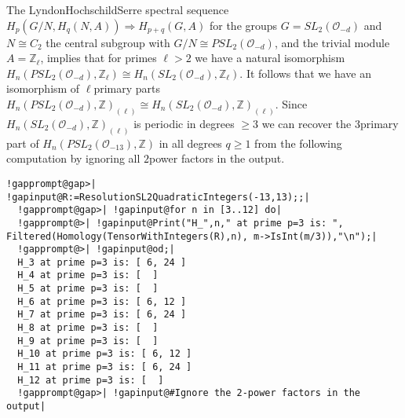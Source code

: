 \documentclass[a4paper,11pt]{report}
\begin{document}
{{\begin{Verbatim}[commandchars=@|A,fontsize=\small,frame=single,label=Example]
\end{Verbatim}
 The Lyndon\texttt{}Hochschild\texttt{}Serre spectral
sequence $H_p(G/N,H_q(N,A)) \Rightarrow H_{p+q}(G,A)$ for the groups $G=SL_2({\mathcal O}_{-d})$ and $N\cong C_2$ the central subgroup with $G/N\cong PSL_2({\mathcal O}_{-d})$, and the trivial module $A = \mathbb Z_{\ell}$, implies that for primes $\ell>2$ we have a natural isomorphism $H_n(PSL_2({\mathcal O}_{-d}),\mathbb Z_{\ell}) \cong H_n(SL_2({\mathcal
O}_{-d}),\mathbb Z_{\ell})$. It follows that we have an isomorphism of $\ell$\texttt{}primary parts $H_n(PSL_2({\mathcal O}_{-d}),\mathbb Z)_{(\ell)} \cong H_n(SL_2({\mathcal
O}_{-d}),\mathbb Z)_{(\ell)}$. Since $ H_n(SL_2({\mathcal O}_{-d}),\mathbb Z)_{(\ell)}$ is periodic in degrees $ \ge 3$ we can recover the $3$\texttt{}primary part of $H_n(PSL_2({\mathcal O}_{-13}),\mathbb Z)$ in all degrees $q\ge1$ from the following computation by ignoring all $2$\texttt{}power factors in the output. 
\begin{Verbatim}[commandchars=!@|,fontsize=\small,frame=single,label=Example]
  !gapprompt@gap>| !gapinput@R:=ResolutionSL2QuadraticIntegers(-13,13);;|
  !gapprompt@gap>| !gapinput@for n in [3..12] do|
  !gapprompt@>| !gapinput@Print("H_",n," at prime p=3 is: ", Filtered(Homology(TensorWithIntegers(R),n), m->IsInt(m/3)),"\n");|
  !gapprompt@>| !gapinput@od;|
  H_3 at prime p=3 is: [ 6, 24 ]
  H_4 at prime p=3 is: [  ]
  H_5 at prime p=3 is: [  ]
  H_6 at prime p=3 is: [ 6, 12 ]
  H_7 at prime p=3 is: [ 6, 24 ]
  H_8 at prime p=3 is: [  ]
  H_9 at prime p=3 is: [  ]
  H_10 at prime p=3 is: [ 6, 12 ]
  H_11 at prime p=3 is: [ 6, 24 ]
  H_12 at prime p=3 is: [  ]
  !gapprompt@gap>| !gapinput@#Ignore the 2-power factors in the output|
  

\end{Verbatim}}}
\end{document}
